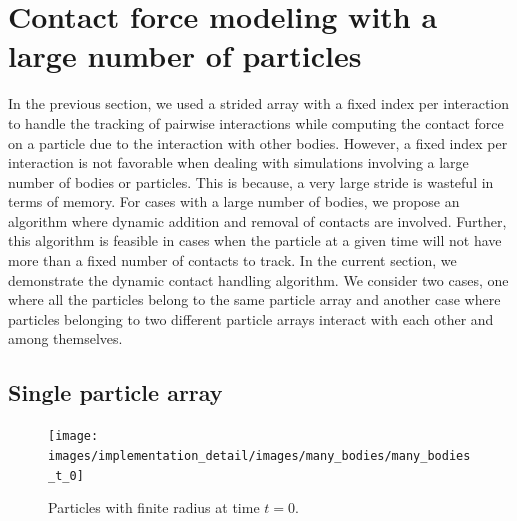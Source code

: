 \FloatBarrier%
\section{Contact force modeling with a large number of particles}
\label{sec:tracking-many-bodies}
In the previous section, we used a strided array with a fixed index per
interaction to handle the tracking of pairwise interactions while computing the
contact force on a particle due to the interaction with other bodies. However, a
fixed index per interaction is not favorable when dealing with simulations
involving a large number of bodies or particles. This is because, a very large
stride is wasteful in terms of memory. For cases with a large number of bodies,
we propose an algorithm where dynamic addition and removal of contacts are
involved. Further, this algorithm is feasible in cases when the particle at a
given time will not have more than a fixed number of contacts to track. In the
current section, we demonstrate the dynamic contact handling algorithm. We
consider two cases, one where all the particles belong to the same particle
array and another case where particles belonging to two different particle
arrays interact with each other and among themselves.

\subsection{Single particle array}
\begin{figure}[!htpb]
  \centering
  \texttt{[image: images/implementation\_detail/images/many\_bodies/many\_bodies\_t\_0]}
  \caption{Particles with finite radius at time $t=0$.}
\label{fig:id:15_particle_t_0}
\end{figure}

